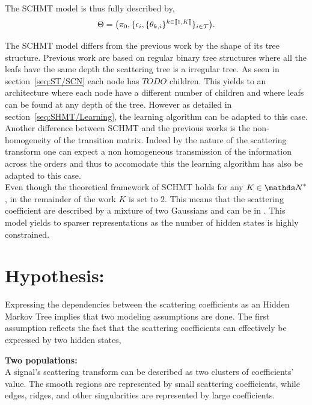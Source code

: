 \documentclass[a4paper,11pt]{report}
\begin{document}
{		The SCHMT model is thus fully described by,
		\begin{equation}
			\Theta = \big(\pi_{0}, \{ \epsilon_{i}, \{ \theta_{k,i} \}^{k\in\llbracket1,K\rrbracket} \}_{i\in\mathcal{T}}\big).
			\label{eq:SCHMT - parameters}
		\end{equation}
		
		
    The SCHMT model differs from the previous work by the shape of its tree structure. Previous work are based on regular binary tree structures where all the leafs have the same depth the scattering tree is a irregular tree. As seen in section~\ref{seq:ST/SCN} each node has $TODO$ children. This yields to an architecture where each node have a different number of children and where leafs can be found at any depth of the tree. However as detailed in section~\ref{seq:SHMT/Learning}, the learning algorithm can be adapted to this case. Another difference between SCHMT and the previous works is the non-homogeneity of the transition matrix. Indeed by the nature of the scattering transform one can expect a non homogeneous transmission of the information across the orders and thus to accomodate this the learning algorithm has also be adapted to this case.\\
    
    Even though the theoretical framework of SCHMT holds for any $K \in \dsN^{\ast}$, in the remainder of the work $K$ is set to $2$. This means that the scattering coefficient are described by a mixture of two Gaussians and can be in . This model yields to sparser representations as the number of hidden states is highly constrained.
    
    
  \section{Hypothesis:}
    \label{seq:SHMT/Hypos}
    
    Expressing the dependencies between the scattering coefficients as an Hidden Markov Tree implies that two modeling assumptions are done. The first assumption reflects the fact that the scattering coefficients can effectively be expressed by two hidden states,\\
    
    \begin{assumption}\textbf{Two populations:}\\
			A signal's scattering transform can be described as two clusters of coefficients' value. The smooth regions are represented by small scattering coefficients, while edges, ridges, and other singularities are represented by large coefficients.\\
			\label{assum:2pop}
    \end{assumption}
    
}
\end{document}
